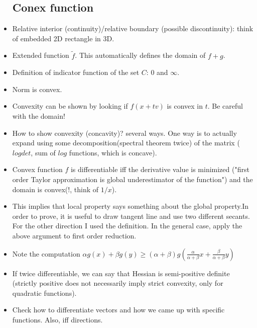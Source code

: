 \documentclass{article}
\theoremstyle{remark}
\begin{document}
\begin{itemize}
    \subsection*{Conex function}
    \item Relative interior (continuity)/relative boundary (possible discontinuity): think of embedded 2D 
    rectangle in 3D.
    \item Extended function $\tilde{f}$. This automatically defines the domain of $f+g$.
    \item Definition of indicator function of the set $C$: $0$ and $\infty$.
    \item Norm is convex.
    \item Convexity can be shown by looking if $f(x+tv)$ is convex in $t$. Be careful with the domain!
    \item How to show convexity (concavity)? several ways. One way is to actually expand using some decomposition(spectral theorem twice) of the matrix ($logdet$, sum of $log$ functions, which is concave).
    \item Convex function $f$ is differentiable iff the derivative value is minimized ("first order Taylor approximation is global underestimator of the function") and the domain is convex(!, think of $1/x$).
    \item This implies that local property says something about the global property.In order to prove, it is useful to draw tangent line and use two different secants. For the other direction I used the definition. In the general case, apply the above argument to first order reduction.
    \item Note the computation $\alpha g(x)+\beta g(y)\geq (\alpha+\beta)g(\frac\alpha{\alpha+\beta}x+\frac\beta{\alpha+\beta}y)$
    \item If twice differentiable, we can say that Hessian is semi-positive definite (strictly positive does not necessarily imply strict convexity, only for quadratic functions).
    \item Check how to differentiate vectors and how we came up with specific functions. Also, iff directions.

\end{itemize}
\end{document}
